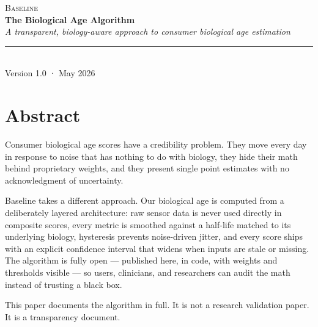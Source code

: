 \documentclass[11pt, a4paper]{article}
\title{}
\author{}
\date{}
\begin{document}
\thispagestyle{titlepage}

\begin{flushleft}
{\color{muted}\fontsize{11}{14}\selectfont\textsc{Baseline}}\\[0.4em]
{\color{accent}\fontsize{30}{36}\selectfont\bfseries The Biological Age Algorithm}\\[0.6em]
{\color{accentlight}\fontsize{14}{18}\selectfont\itshape A transparent, biology-aware approach to consumer biological age estimation}\\[1.2em]
{\color{rule}\rule{\linewidth}{0.6pt}}\\[0.4em]
{\color{muted}\small Version 1.0 \quad · \quad May 2026}
\end{flushleft}

\vspace{1.5em}

\section*{Abstract}

\begin{abstractbox}
Consumer biological age scores have a credibility problem. They move every day in response to noise that has nothing to do with biology, they hide their math behind proprietary weights, and they present single point estimates with no acknowledgment of uncertainty.

\medskip

Baseline takes a different approach. Our biological age is computed from a deliberately layered architecture: raw sensor data is never used directly in composite scores, every metric is smoothed against a half-life matched to its underlying biology, hysteresis prevents noise-driven jitter, and every score ships with an explicit confidence interval that widens when inputs are stale or missing. The algorithm is fully open --- published here, in code, with weights and thresholds visible --- so users, clinicians, and researchers can audit the math instead of trusting a black box.

\medskip

This paper documents the algorithm in full. It is not a research validation paper. It is a transparency document.
\end{abstractbox}

\end{document}
